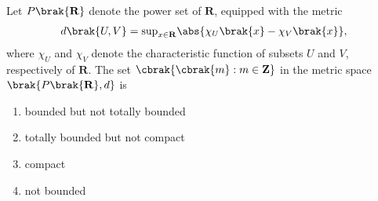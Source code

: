 		\item 
		Let $P\brak{\mathbf{R}}$ denote the power set of $\mathbf{R}$, equipped with the metric 
		\begin{align*}
			d\brak{U,V} = \text{sup}_{x \in \mathbf{R}}\abs{\chi_U\brak{x} - \chi_V\brak{x}},
		\end{align*}
		where $\chi_U$ and $\chi_V$ denote the characteristic function of subsets $U$ and $V$, respectively of $\mathbf{R}$. The set $\cbrak{\cbrak{m}:m \in \mathbf{Z}}$ in the metric space $\brak{P\brak{\mathbf{R}}, d}$ is 
		
		\hfill{}
		
		\begin{multicols}{2}
			\begin{enumerate}
				\item bounded but not totally bounded 
				\item totally bounded but not compact
				\item compact 
				\item not bounded
			\end{enumerate}
		\end{multicols}
